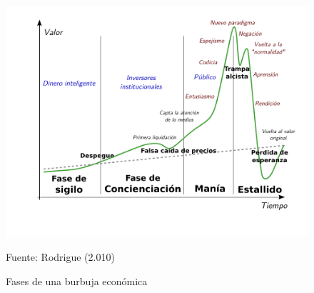 \begin{figure}[!h] 
\caption{Fases de una burbuja económica} 
\centering \includegraphics[width=150mm]{capitulos/graficos/bubbleFases} 
\label{fig:bubbleFases} 

	\footnotesize
	Fuente: Rodrigue (2.010)

\end{figure}


